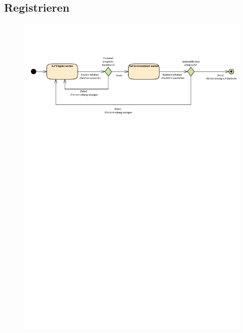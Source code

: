 \subsection*{Registrieren}
\begin{figure}[h!]
	\centering
	\includegraphics[width = 0.8\linewidth]{docs/4_Zustandsdiagramme/Markus/Registrieren.pdf}
	\label{fig:STM_Registrieren}
\end{figure}